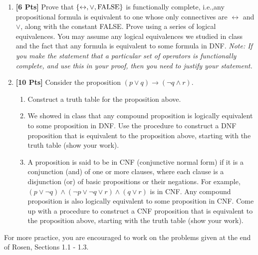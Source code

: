 \begin{enumerate}
\item {\bf [6 Pts]} Prove that $\{\leftrightarrow, \vee, \rm FALSE\}$ is functionally complete, i.e.,any propositional formula is equivalent to one whose only connectives are $\leftrightarrow$ and $\vee$, along with the constant FALSE. Prove using a series of logical equivalences. You may assume any logical equivalences we studied in class and the fact that any formula is equivalent to some formula in DNF. {\it Note: If you make the statement that a particular set of operators is functionally complete, and use this in your proof, then you need to justify your statement.}

\item {\bf [10 Pts]} Consider the proposition $(p \vee q) \rightarrow (\neg q \wedge r)$. 
\begin{enumerate}
\item Construct a truth table for the proposition above.
\item We showed in class that any compound proposition is logically equivalent to some proposition in DNF. Use the procedure to construct a DNF proposition that is equivalent to the proposition above, starting with the truth table (show your work).
\item A proposition is said to be in CNF (conjunctive normal form) if it is a conjunction (and) of one or more clauses, where each clause is a disjunction (or) of basic propositions or their negations. For example, $(p \vee \neg q) \wedge (\neg p \vee \neg q \vee r) \wedge (q \vee r)$ is in CNF. Any compound proposition is also logically equivalent to some proposition in CNF. Come up with a procedure to construct a CNF proposition that is equivalent to the proposition above, starting with the truth table (show your work).
\end{enumerate}

\end{enumerate}

For more practice, you are encouraged to work on the problems given at the end of Rosen, Sections 1.1 - 1.3.




